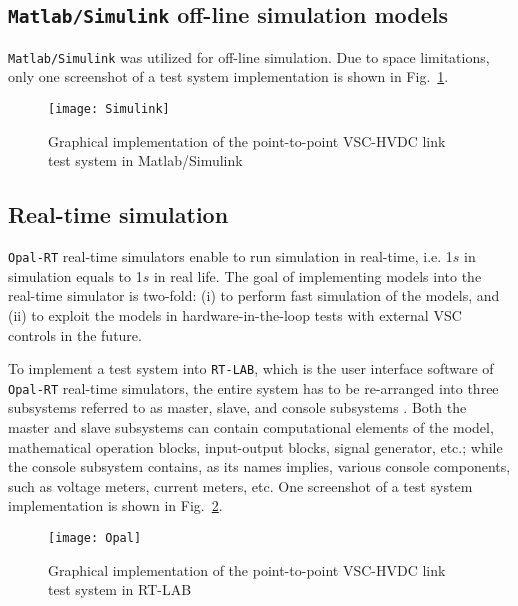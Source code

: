 \documentclass[conference]{IEEEtran}
\begin{document}
\subsection{\texttt{Matlab/Simulink} off-line simulation models}
\texttt{Matlab/Simulink} was utilized for off-line simulation. Due to space limitations, only one screenshot of a test system implementation is shown in Fig.~\ref{Simulink}.
\begin{figure}[!ht]
\centering
\texttt{[image: Simulink]}
\caption{Graphical implementation of the point-to-point VSC-HVDC link test system in Matlab/Simulink \cite{Naveed}}
\label{Simulink}
\end{figure}
\subsection{Real-time simulation}
\texttt{Opal-RT} real-time simulators enable to run simulation in real-time, i.e. 1$s$ in simulation equals to 1$s$ in real life. The goal of implementing models into the real-time simulator is two-fold: (i) to perform fast simulation of the models, and (ii) to exploit the models in hardware-in-the-loop tests with external VSC controls in the future. 

To implement a test system into \texttt{RT-LAB}, which is the user interface software of \texttt{Opal-RT} real-time simulators, the entire system has to be re-arranged into three subsystems referred to as master, slave, and console subsystems \cite{Rokib}. Both the master and slave subsystems can contain computational elements of the model, mathematical operation blocks, input-output blocks, signal generator, etc.; while the console subsystem contains, as its names implies, various console components, such as voltage meters, current meters, etc. One screenshot of a test system implementation is shown in Fig.~\ref{Opal}.
\begin{figure}[!ht]
\centering
\texttt{[image: Opal]}
\caption{Graphical implementation of the point-to-point VSC-HVDC link test system in RT-LAB \cite{Rokib}}
\label{Opal}
\end{figure}
\end{document}
